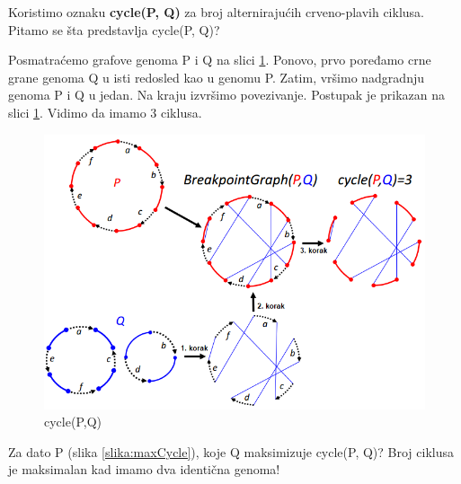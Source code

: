 Koristimo oznaku \textbf{cycle(P, Q)} za broj alternirajućih crveno-plavih ciklusa. Pitamo se šta predstavlja cycle(P, Q)?

Posmatraćemo grafove genoma P i Q na slici \ref{slika:ciklusi}. Ponovo, prvo poređamo crne grane genoma Q u isti redosled kao u genomu P. Zatim, vršimo nadgradnju genoma P i Q u jedan. Na kraju izvršimo povezivanje. Postupak je prikazan na slici \ref{slika:ciklusi}. Vidimo da imamo 3 ciklusa.

\begin{figure}[h!]
\centering
\includegraphics[scale=0.55]{poglavlja/6/slike/cycle.PNG}
\caption{cycle(P,Q)}
\label{slika:ciklusi}
\end{figure}


Za dato P (slika \ref{slika:maxCycle}), koje Q maksimizuje cycle(P, Q)? Broj ciklusa je maksimalan kad imamo dva identična genoma!

